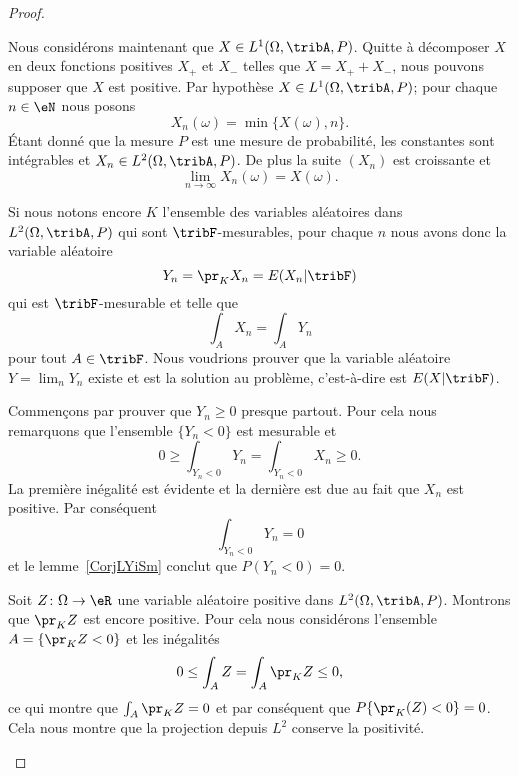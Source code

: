 \begin{proof}
\begin{subproof}

		Nous considérons maintenant que \( X\in L^1(\Omega,\tribA,P)\). Quitte à décomposer \( X\) en deux fonctions positives \( X_+\) et \( X_-\) telles que \( X=X_++X_-\), nous pouvons supposer que \( X\) est positive. Par hypothèse \( X\in L^1(\Omega,\tribA,P)\); pour chaque \( n\in\eN\) nous posons
		\begin{equation}
			X_n(\omega)=\min\{ X(\omega),n \}.
		\end{equation}
		Étant donné que la mesure \( P\) est une mesure de probabilité, les constantes sont intégrables et \( X_n\in L^2(\Omega,\tribA,P)\). De plus la suite \( (X_n)\) est croissante et
		\begin{equation}
			\lim_{n\to \infty} X_n(\omega)=X(\omega).
		\end{equation}

		Si nous notons encore \( K\) l'ensemble des variables aléatoires dans \( L^2(\Omega,\tribA,P)\) qui sont \( \tribF\)-mesurables, pour chaque \( n\) nous avons donc la variable aléatoire
		\begin{equation}
			Y_n=\pr_KX_n=E(X_n|\tribF)
		\end{equation}
		qui est \( \tribF\)-mesurable et telle que
		\begin{equation}
			\int_A X_n=\int_AY_n
		\end{equation}
		pour tout \( A\in\tribF\). Nous voudrions prouver que la variable aléatoire \( Y=\lim_nY_n\) existe et est la solution au problème, c'est-à-dire est \( E(X|\tribF)\).

		Commençons par prouver que \( Y_n\geq 0\) presque partout. Pour cela nous remarquons que l'ensemble \( \{ Y_n<0 \}\) est mesurable et
		\begin{equation}
			0\geq\int_{Y_n<0}Y_n=\int_{Y_n<0}X_n\geq 0.
		\end{equation}
		La première inégalité est évidente et la dernière est due au fait que \( X_n\) est positive. Par conséquent
		\begin{equation}
			\int_{Y_n<0}Y_n=0
		\end{equation}
		et le lemme~\ref{CorjLYiSm} conclut que \( P(Y_n<0)=0\).

		Soit \( Z\colon \Omega\to \eR\) une variable aléatoire positive dans \( L^2(\Omega,\tribA,P)\). Montrons que \( \pr_KZ\) est encore positive. Pour cela nous considérons l'ensemble \( A=\{ \pr_KZ<0 \}\) et les inégalités
		\begin{equation}
			0\leq \int_AZ=\int_A\pr_KZ\leq 0,
		\end{equation}
		ce qui montre que \( \int_A\pr_KZ=0\) et par conséquent que \( P\{ \pr_K(Z)<0 \}=0\). Cela nous montre que la projection depuis \( L^2\) conserve la positivité.


\end{subproof}
\end{proof}
